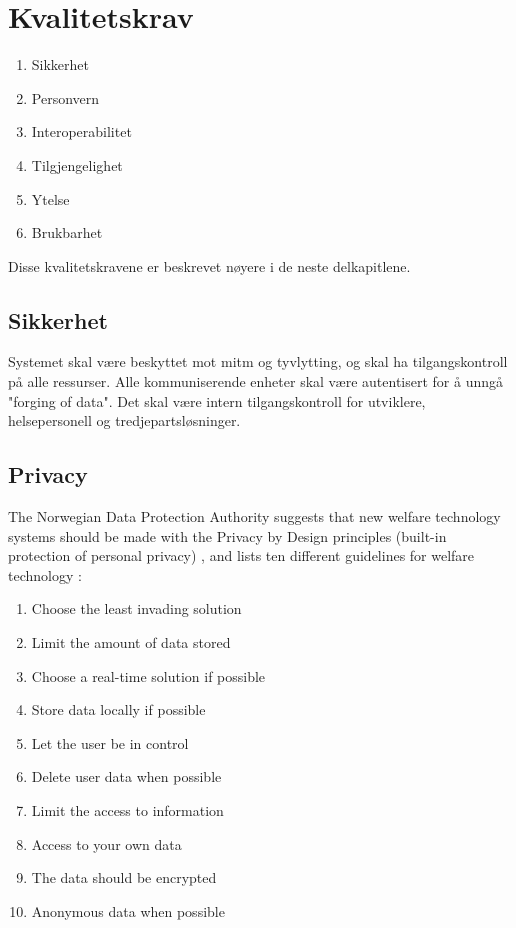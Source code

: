 
\section{Kvalitetskrav}

\begin{enumerate}
    \item Sikkerhet
    \item Personvern
    \item Interoperabilitet
    \item Tilgjengelighet
    \item Ytelse
    \item Brukbarhet
\end{enumerate}

Disse kvalitetskravene er beskrevet nøyere i de neste delkapitlene.

\subsection{Sikkerhet}
Systemet skal være beskyttet mot \gls{mitm} og tyvlytting, og skal ha tilgangskontroll på alle ressurser.
Alle kommuniserende enheter skal være autentisert for å unngå "forging of data". %
Det skal være intern tilgangskontroll for utviklere, helsepersonell og tredjepartsløsninger.

\subsection{Privacy}
The Norwegian Data Protection Authority suggests that new welfare technology systems should be made with the Privacy by Design principles (built-in protection of personal privacy) \citep{datatilsynet_privacy}, and lists ten different guidelines for
welfare technology \citep{datatilsynet_welfare}:

\begin{enumerate}
    \item Choose the least invading solution
    \item Limit the amount of data stored
    \item Choose a real-time solution if possible
    \item Store data locally if possible
    \item Let the user be in control
    \item Delete user data when possible
    \item Limit the access to information
    \item Access to your own data
    \item The data should be encrypted
    \item Anonymous data when possible 
\end{enumerate}

